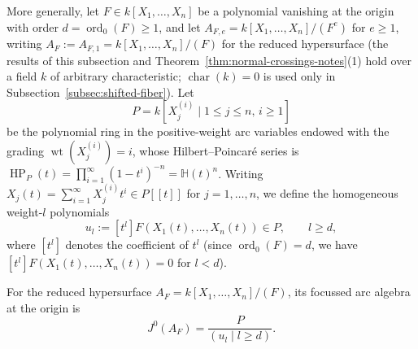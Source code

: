 \documentclass[a4paper, 12pt]{amsart}
\theoremstyle{remark}
\begin{document}
More generally, let $F \in k[X_1, \dots, X_n]$ be a polynomial vanishing at the origin with order $d = \operatorname{ord}_0(F) \ge 1$, and let $A_{F, e} = k[X_1, \dots, X_n] / (F^e)$ for $e \ge 1$, writing $A_F := A_{F, 1} = k[X_1, \dots, X_n] / (F)$ for the reduced hypersurface (the results of this subsection and Theorem~\ref{thm:normal-crossings-notes}(1) hold over a field $k$ of arbitrary characteristic;
$\operatorname{char}(k) = 0$ is used only in Subsection~\ref{subsec:shifted-fiber}).
Let
\begin{equation}
  P = k[X_j^{(i)} \mid 1 \le j \le n, \, i \ge 1]
\end{equation}
be the polynomial ring in the positive-weight arc variables endowed with the grading $\operatorname{wt}(X_j^{(i)}) = i$,
whose Hilbert--Poincaré series is $\operatorname{HP}_{P}(t) = \prod_{i = 1}^\infty (1 - t^i)^{-n} = \mathbb{H}(t)^n$.
Writing $X_j(t) = \sum_{i = 1}^\infty X_j^{(i)} t^i \in P[[t]]$ for $j = 1, \dots, n$,
we define the homogeneous weight-$l$ polynomials
\begin{equation}
  u_l := [t^l] F(X_1(t), \dots, X_n(t)) \in P, \qquad l \ge d,
\end{equation}
where $[t^l]$ denotes the coefficient of $t^l$
(since $\operatorname{ord}_0(F) = d$, we have $[t^l]F(X_1(t), \dots, X_n(t)) = 0$ for $l < d$).

For the reduced hypersurface $A_F = k[X_1, \dots, X_n] / (F)$,
its focussed arc algebra at the origin is
\begin{equation*}
  J^0(A_F) = \frac{P}{(u_l \mid l \ge d)}.
\end{equation*}
\end{document}
